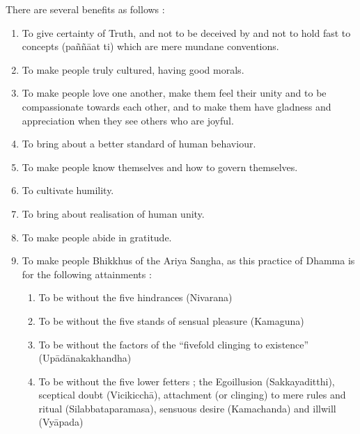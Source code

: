 \documentclass[a5paper,10pt,english]{book}
\begin{document}
\sphinxAtStartPar
{} There are several benefits as follows :
\begin{enumerate}
%
\item {} 
\sphinxAtStartPar
To give certainty of Truth, and not to be deceived by and not to hold fast to concepts (paññāat ti) which are mere mundane conventions.

\item {} 
\sphinxAtStartPar
To make people truly cultured, having good morals.

\item {} 
\sphinxAtStartPar
To make people love one another, make them feel their unity and to be compassionate towards each other, and to make them have gladness and appreciation when they see others who are joyful.

\item {} 
\sphinxAtStartPar
To bring about a better standard of human behaviour.

\item {} 
\sphinxAtStartPar
To make people know themselves and how to govern themselves.

\item {} 
\sphinxAtStartPar
To cultivate humility.

\item {} 
\sphinxAtStartPar
To bring about realisation of human unity.

\item {} 
\sphinxAtStartPar
To make people abide in gratitude.

\item {} 
\sphinxAtStartPar
To make people Bhikkhus of the Ariya Sangha, as this practice of Dhamma is for the following attainments :\sphinxhyphen{}
\begin{enumerate}
%
\item {} 
\sphinxAtStartPar
To be without the five hindrances (Nivarana)

\item {} 
\sphinxAtStartPar
To be without the five stands of sensual pleasure (Kamaguna)

\item {} 
\sphinxAtStartPar
To be without the factors of the “fivefold clinging to existence” (Upādānakakhandha)

\item {} 
\sphinxAtStartPar
To be without the five lower fetters ; the Ego\sphinxhyphen{}illusion (Sakkayaditthi), sceptical doubt (Vicikicchā), attachment (or clinging) to mere rules and ritual (Silabbataparamasa), sensuous desire (Kamachanda) and ill\sphinxhyphen{}will (Vyāpada)


\end{enumerate}
\end{enumerate}
\end{document}

